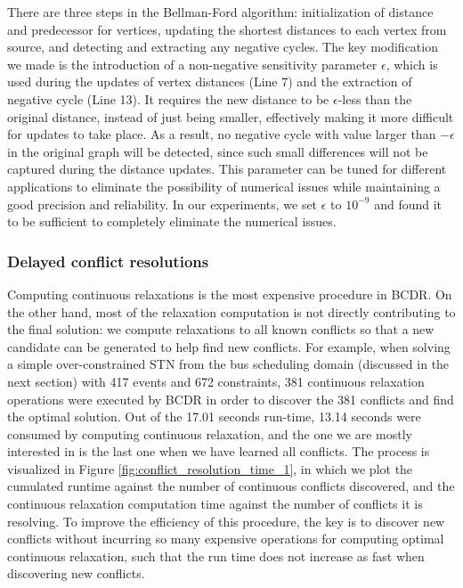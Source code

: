 \documentclass[jair,twoside,11pt,theapa]{article}
\begin{document}
There are three steps in the Bellman-Ford algorithm: initialization of distance
and predecessor for vertices, updating the shortest distances to each vertex
from source, and detecting and extracting any negative cycles. The key
modification we made is the introduction of a non-negative sensitivity parameter
$\epsilon$, which is used during the updates of vertex distances (Line 7) and
the extraction of negative cycle (Line 13). It requires the new distance to be
$\epsilon$-less than the original distance, instead of just being smaller,
effectively making it more difficult for updates to take place. As a result, no
negative cycle with value larger than $-\epsilon$ in the original graph will be
detected, since such small differences will not be captured during the distance
updates. This parameter can be tuned for different applications to eliminate the
possibility of numerical issues while maintaining a good precision and
reliability. In our experiments, we set $\epsilon$ to $10^{-9}$ and found it to
be sufficient to completely eliminate the numerical issues.


\subsubsection{Delayed conflict resolutions}


Computing continuous relaxations is the most expensive procedure in BCDR. On the other hand, most of the
relaxation computation is not directly contributing to the final solution: we
compute relaxations to all known conflicts so that a new candidate can be generated
to help find new conflicts. For example, when solving a simple over-constrained
STN from the bus scheduling domain (discussed in the next section) with 417
events and 672 constraints, 381 continuous relaxation operations were executed
by BCDR in order to discover the 381 conflicts and find the optimal solution.
Out of the 17.01 seconds run-time, 13.14 seconds were consumed by computing continuous
relaxation, and the one we are mostly interested in is the last one when we have
learned all conflicts. The process is visualized in Figure
\ref{fig:conflict_resolution_time_1}, in which we plot the cumulated runtime
against the number of continuous conflicts discovered, and the continuous relaxation computation time against
the number of conflicts it is resolving. To improve the efficiency of this
procedure, the key is to discover new conflicts without incurring so many
expensive operations for computing optimal continuous relaxation, such
that the run time does not increase as fast when discovering new conflicts.
\end{document}

